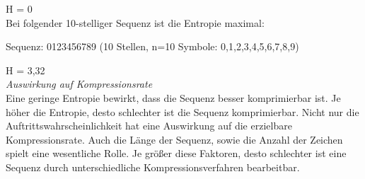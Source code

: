 \documentclass[12pt,german]{article}
\begin{document}
H = 0\\

Bei folgender 10-stelliger Sequenz ist die Entropie maximal:

Sequenz: 0123456789 (10 Stellen, n=10 Symbole: 0,1,2,3,4,5,6,7,8,9)

H = 3,32\\

\textit{Auswirkung auf Kompressionsrate}\\

Eine geringe Entropie bewirkt, dass die Sequenz besser komprimierbar ist.  Je höher die Entropie, desto schlechter ist die Sequenz komprimierbar. Nicht nur die Auftrittswahrscheinlichkeit hat eine Auswirkung auf die erzielbare Kompressionsrate. Auch die Länge der Sequenz, sowie die Anzahl der Zeichen spielt eine wesentliche Rolle. Je größer diese Faktoren, desto schlechter ist eine Sequenz durch unterschiedliche Kompressionsverfahren bearbeitbar.
\end{document}
